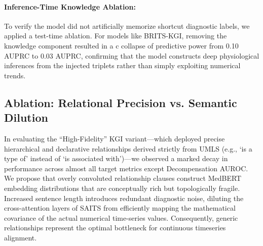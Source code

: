 \paragraph{Inference-Time Knowledge Ablation:}
To verify the model did not artificially memorize shortcut diagnostic labels, we applied a test-time ablation. For models like BRITS-KGI, removing the knowledge component resulted in a c collapse of predictive power from 0.10 AUPRC to 0.03 AUPRC, confirming that the model constructs deep physiological inferences from the injected triplets rather than simply exploiting numerical trends.

\subsection{Ablation: Relational Precision vs. Semantic Dilution}
In evaluating the ``High-Fidelity'' KGI variant---which deployed precise hierarchical and declarative relationships derived strictly from UMLS (e.g., `is a type of' instead of `is associated with')---we observed a marked decay in performance across almost all target metrics except Decompensation AUROC. We propose that overly convoluted relationship clauses construct MedBERT embedding distributions that are conceptually rich but topologically fragile. Increased sentence length introduces redundant diagnostic noise, diluting the cross-attention layers of SAITS from efficiently mapping the mathematical covariance of the actual numerical time-series values. Consequently, generic relationships represent the optimal bottleneck for continuous timeseries alignment.
